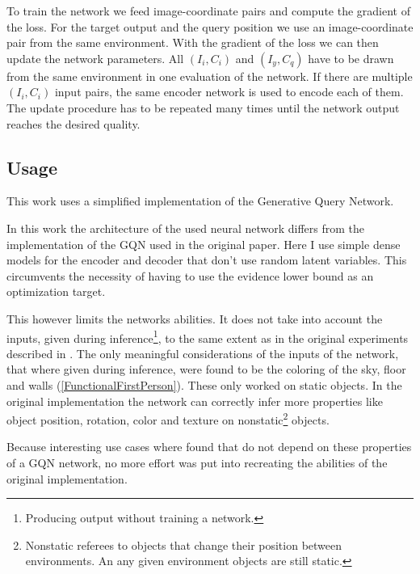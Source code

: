 To train the network we feed image-coordinate pairs and compute the gradient of the loss. For the target output and the query position we use an image-coordinate pair from the same environment. With the gradient of the loss we can then update the network parameters. All $(I_i, C_i)$ and $(I_y, C_q)$ have to be drawn from the same environment in one evaluation of the network. If there are multiple $(I_i, C_i)$ input pairs, the same encoder network is used to encode each of them. The update procedure has to be repeated many times until the network output reaches the desired quality.

\GQNArchitectureGraph


\subsection{Usage}
This work uses a simplified implementation of the Generative Query Network.

In this work the architecture of the used neural network differs from the implementation of the GQN used in the original paper. Here I use simple dense models for the encoder and decoder that don't use random latent variables. This circumvents the necessity of having to use the evidence lower bound as an optimization target.

This however limits the networks abilities. It does not take into account the inputs, given during inference\footnote{Producing output without training a network.}, to the same extent as in the original experiments described in \cite{gqn}. The only meaningful considerations of the inputs of the network, that where given during inference, were found to be the coloring of the sky, floor and walls (\cref{FunctionalFirstPerson}). These only worked on static objects. In the original implementation the network can correctly infer more properties like object position, rotation, color and texture on nonstatic\footnote{Nonstatic referees to objects that change their position between environments. An any given environment objects are still static.} objects.

Because interesting use cases where found that do not depend on these properties of a GQN network, no more effort was put into recreating the abilities of the original implementation.
